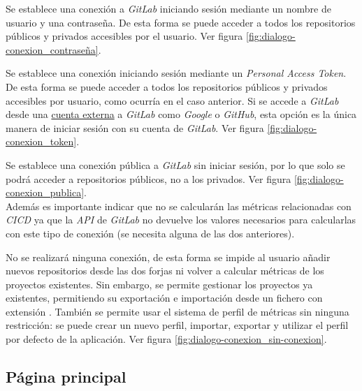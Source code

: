 \begin{description}
	\tightlist
	\item[Iniciar sesión en \textit{GitLab} mediante usuario y contraseña.] Se establece una conexión a \textit{GitLab} iniciando sesión mediante un nombre de usuario y una contraseña. De esta forma se puede acceder a todos los repositorios públicos y privados accesibles por el usuario. Ver figura \ref{fig:dialogo-conexion_contraseña}.
	\item[Iniciar sesión mediante \textit{Personal Access Token}.] Se establece una conexión iniciando sesión mediante un \textit{Personal Access Token}. De esta forma se puede acceder a todos los repositorios públicos y privados accesibles por usuario, como ocurría en el caso anterior. 
	Si se accede a \textit{GitLab} desde una \underline{cuenta externa} a \textit{GitLab} como \textit{Google} o \textit{GitHub}, esta opción es la única manera de iniciar sesión con su cuenta de \textit{GitLab}. Ver figura \ref{fig:dialogo-conexion_token}.\\
	\item[Usar una conexión pública hacia \textit{GitLab}.] Se establece una conexión pública a \textit{GitLab} sin iniciar sesión, por lo que solo se podrá acceder a repositorios públicos, no a los privados. Ver figura \ref{fig:dialogo-conexion_publica}.\\
	Además es importante indicar que no se calcularán las métricas relacionadas con \textit{CICD} ya que la \textit{API} de \textit{GitLab} no devuelve los valores necesarios para calcularlas con este tipo de conexión (se necesita alguna de las dos anteriores).
	\item[No utilizar ninguna conexión.] No se realizará ninguna conexión, de esta forma se impide al usuario añadir nuevos repositorios desde las dos forjas ni volver a calcular métricas de los proyectos existentes. Sin embargo, se permite gestionar los proyectos ya existentes, permitiendo su exportación e importación desde un fichero con extensión . También se permite usar el sistema de perfil de métricas sin ninguna restricción: se puede crear un nuevo perfil, importar, exportar y utilizar el perfil por defecto de la aplicación. Ver figura \ref{fig:dialogo-conexion_sin-conexion}.
\end{description}

\newpage
\subsection{Página principal}

